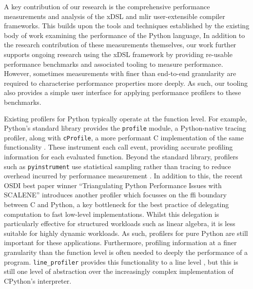 A key contribution of our research is the comprehensive performance measurements and analysis of the xDSL and \ac{mlir} user-extensible compiler frameworks.
This builds upon the tools and techniques established by the existing body of work examining the performance of the Python language,
In addition to the research contribution of these measurements themselves, our work further supports ongoing research using the xDSL framework by providing re-usable performance benchmarks and associated tooling to measure performance.
However, sometimes measurements with finer than end-to-end granularity are required to characterise performance properties more deeply. As such, our tooling also provides a simple user interface for applying performance profilers to these benchmarks.


Existing profilers for Python typically operate at the function level.
For example, Python's standard library provides the \texttt{profile} module, a Python-native tracing profiler, along with \texttt{cProfile}, a more performant C implementation of the same functionality \cite{pythonsoftwarefoundationPythonProfilers}. These instrument each call event, providing accurate profiling information for each evaluated function.
Beyond the standard library, profilers such as \texttt{pyinstrument} use statistical sampling rather than tracing to reduce overhead incurred by performance measurement \cite{rickerbyPyinstrument2025}.
In addition to this, the recent OSDI best paper winner ``Triangulating Python Performance Issues with SCALENE'' \cite{bergerTriangulatingPythonPerformance2023a} introduces another profiler which focusses on the \ac{ffi} boundary between C and Python, a key bottleneck for the best practice of delegating computation to fast low-level implementations.
Whilst this delegation is particularly effective for structured workloads such as linear algebra, it is less suitable for highly dynamic workloads. %
As such, profilers for pure Python are still important for these applications.
Furthermore, profiling information at a finer granularity than the function level is often needed to deeply the performance of a program.
\texttt{line\_profiler} provides this functionality to a line level \cite{robertkernPyutilsLine_profiler2025}, but this is still one level of abstraction over the increasingly complex implementation of CPython's interpreter.

